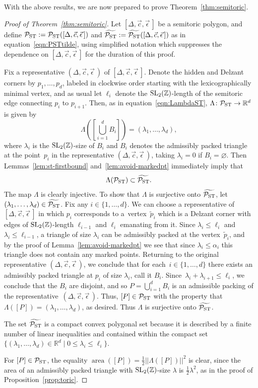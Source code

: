 \documentclass[10pt,a4paper]{amsart}
\numberwithin{equation}{section}
\def\R{{\mathbb R}}
\def\Z{{\mathbb Z}}
\newcommand{\De}{\Delta}
\newcommand{\area}{\operatorname{area}}
\newcommand{\PST}{\mathcal{P}_{\rm ST}}
\newcommand{\PSTtilde}{\widetilde{\mathcal{P}_{\rm ST}}}
\newcommand{\SL}{{\rm SL}_2(\Z)}
\newcommand{\stpoly}{[\De,\vec{c},\vec{\epsilon}\,]}
\newcommand{\strep}{(\De,\vec{c},\vec{\epsilon}\,)}
\theoremstyle{definition}
\theoremstyle{plain}
\theoremstyle{plain}
\begin{document}
With the above results, we are now prepared to prove Theorem~\ref{thm:semitoric}.


\begin{proof}[Proof of Theorem~\ref{thm:semitoric}]
Let $\stpoly$ be a semitoric polygon, and define $\PST := \PST (\stpoly)$ and $\PSTtilde := \PSTtilde(\stpoly)$ as in equation~\eqref{eqn:PSTtilde}, using simplified notation which suppresses the dependence on $\stpoly$ for the duration of this proof.

Fix a representative $\strep$ of $\stpoly$.
Denote the hidden and Delzant corners by $p_1,\ldots, p_d$, labeled in clockwise order starting with the lexicographically minimal vertex, and as usual let $\ell_i$ denote the $\SL$-length of the semitoric edge connecting $p_i$ to $p_{i+1}$.
Then, as in equation~\eqref{eqn:LambdaST}, $\Lambda\colon \PST \to \R^d$ is given by
\[
\Lambda\left(\left[\bigcup_{i=1}^d B_i\right]\right) = (\lambda_1,\ldots,\lambda_d),
\]
where $\lambda_i$ is the $\SL$-size of $B_i$ and $B_i$ denotes the admissibly packed triangle at the point~$p_i$ in the representative $\strep$, taking $\lambda_i=0$ if $B_i=\varnothing$.
Then Lemmas~\ref{lem:st-firstbound} and~\ref{lem:avoid-markedpt} immediately imply that
\[
 \Lambda(\PST)\subset \PSTtilde.
\]
The map $\Lambda$ is clearly injective.
To show that $\Lambda$ is surjective onto $\PSTtilde$, let $(\lambda_1,\ldots,\lambda_d)\in\PSTtilde$.
Fix any $i\in\{1,\ldots,d\}$.
We can choose a representative of $\stpoly$ in which $p_i$ corresponds to a~vertex~$\widetilde{p}_i$ which is a Delzant corner with edges of $\SL$-length $\ell_{i-1}$ and $\ell_i$ emanating from it.
Since $\lambda_i\leq \ell_i$ and $\lambda_i\leq \ell_{i-1}$, a triangle of size $\lambda_i$ can be admissibly packed at the vertex~$\widetilde{p}_i$, and by the proof of Lemma~\ref{lem:avoid-markedpt} we see that since $\lambda_i\leq \alpha_i$ this triangle does not contain any marked points.
Returning to the original representative $\strep$, we conclude that for each~$i\in\{1,\ldots,d\}$ there exists an admissibly packed triangle at $p_i$ of size $\lambda_i$, call it $B_i$.
Since~$\lambda_i+\lambda_{i+1}\leq \ell_i$, we conclude that the $B_i$ are disjoint, and so $P = \bigcup_{i=1}^d B_i$ is an admissible packing of the representative~$\strep$.
Thus, $[P]\in\PST$ with the property that~$\Lambda([P]) = (\lambda_1,\ldots,\lambda_d)$, as desired. Thus $\Lambda$ is surjective onto $\PSTtilde$.

The set $\PSTtilde$ is a compact convex polygonal set because it is described by a finite number of linear inequalities and contained within the compact set $\{(\lambda_1,\ldots,\lambda_d)\in\R^d \mid 0\leq \lambda_i\leq \ell_i\}$.

For $[P]\in\PST$, the equality $\area ([P]) = \frac{1}{2}||\Lambda([P])||^2$ is clear, since the area of an admissibly packed triangle with $\SL$-size $\lambda$ is $\frac{1}{2}\lambda^2$, as in the proof of Proposition~\ref{prop:toric}.
\end{proof}
\end{document}
